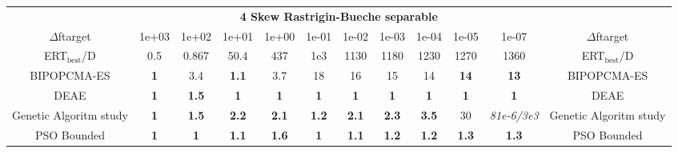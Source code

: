 \begin{tabular}{cccccccccccc}
 & \multicolumn{10}{c}{{\normalsize \textbf{4 Skew Rastrigin-Bueche separable}}}\\
$\Delta$ftarget& 1e+03& 1e+02& 1e+01& 1e+00& 1e-01& 1e-02& 1e-03& 1e-04& 1e-05& 1e-07 & $\Delta$ftarget \\
ERT$_{\textrm{best}}$/D& 0.5& 0.867& 50.4& 437& 1e3& 1130& 1180& 1230& 1270& 1360 & ERT$_{\textrm{best}}$/D \\
\hline
BIPOPCMA-ES & \textbf{1} & 3.4 & \textbf{1.1} & 3.7 & 18 & 16 & 15 & 14 & \textbf{14} & \textbf{13} & BIPOPCMA-ES \cite{add_an_entry_for_BIPOPCMA-ES_in_bbob.bib}\\
DEAE & \textbf{1} & \textbf{1.5} & \textbf{1} & \textbf{1} & \textbf{1} & \textbf{1} & \textbf{1} & \textbf{1} & \textbf{1} & \textbf{1} & DEAE \cite{add_an_entry_for_DEAE_in_bbob.bib}\\
Genetic Algoritm study & \textbf{1} & \textbf{1.5} & \textbf{2.2} & \textbf{2.1} & \textbf{1.2} & \textbf{2.1} & \textbf{2.3} & \textbf{3.5} & 30 & \textit{81e-6}\textit{/3e3} & Genetic Algoritm study \cite{add_an_entry_for_Genetic Algoritm study_in_bbob.bib}\\
PSO Bounded & \textbf{1} & \textbf{1} & \textbf{1.1} & \textbf{1.6} & \textbf{1} & \textbf{1.1} & \textbf{1.2} & \textbf{1.2} & \textbf{1.3} & \textbf{1.3} & PSO Bounded \cite{add_an_entry_for_PSO Bounded_in_bbob.bib}
\end{tabular}
